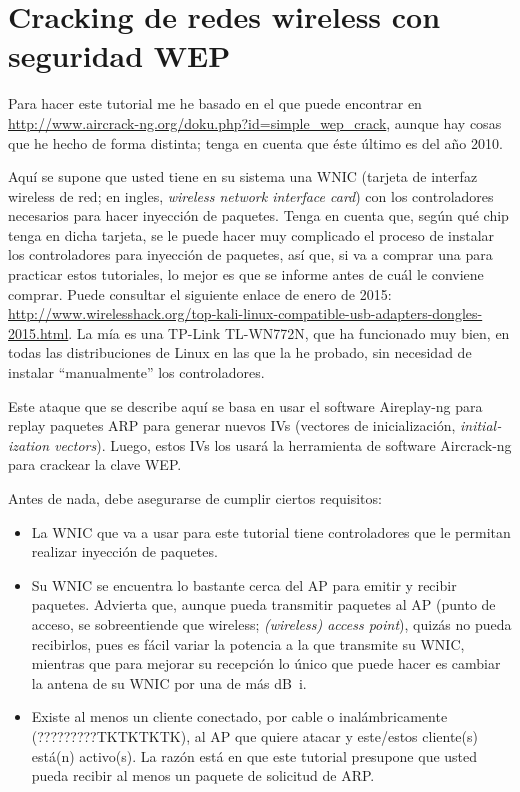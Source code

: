 \section{Cracking de redes wireless con seguridad WEP}\label{sec:crack-wep}
Para hacer este tutorial me he basado en el que puede encontrar en
\url{http://www.aircrack-ng.org/doku.php?id=simple_wep_crack}, aunque hay cosas que he hecho de forma distinta;
tenga en cuenta que éste último es del año 2010.

Aquí se supone que usted tiene en su sistema una WNIC (tarjeta de interfaz wireless de red; en ingles,
\foreignlanguage{english}{\textit{wireless network interface card}}) con los controladores necesarios para hacer
inyección de paquetes. Tenga en cuenta que, según qué chip tenga en dicha tarjeta, se le puede hacer muy
complicado el proceso de instalar los controladores para inyección de paquetes, así que, si va a comprar una
para practicar estos tutoriales, lo mejor es que se informe antes de cuál le conviene comprar. Puede consultar
el siguiente enlace de enero de 2015:
\url{http://www.wirelesshack.org/top-kali-linux-compatible-usb-adapters-dongles-2015.html}. La mía es una
TP-Link TL-WN772N, que ha funcionado muy bien, en todas las distribuciones de Linux en las que la he probado,
sin necesidad de instalar ``manualmente'' los controladores.

Este ataque que se describe aquí se basa en usar el software Aireplay-ng para replay paquetes ARP para generar
nuevos IVs (vectores de inicialización, \foreignlanguage{english}{\textit{initialization vectors}}). Luego,
estos IVs los usará la herramienta de software Aircrack-ng para crackear la clave WEP.

Antes de nada, debe asegurarse de cumplir ciertos requisitos:

\begin{itemize}
  \item La WNIC que va a usar para este tutorial tiene controladores que le permitan realizar inyección
    de paquetes.
  \item Su WNIC se encuentra lo bastante cerca del AP para emitir y recibir paquetes. Advierta que, aunque pueda
    transmitir paquetes al AP (punto de acceso, se sobreentiende que wireless;
    \foreignlanguage{english}{\textit{(wireless) access point}}), quizás no pueda recibirlos, pues es fácil
    variar la potencia a la que transmite su WNIC, mientras que para mejorar su recepción lo único que puede
    hacer es cambiar la antena de su WNIC por una de más \si{\deci\bel i}.
  \item Existe al menos un cliente conectado, por cable o inalámbricamente (?????????TKTKTKTK), al AP que quiere
    atacar y este/estos cliente(s) está(n) activo(s). La razón está en que este tutorial presupone que usted
    pueda recibir al menos un paquete de solicitud de ARP.
\end{itemize}

